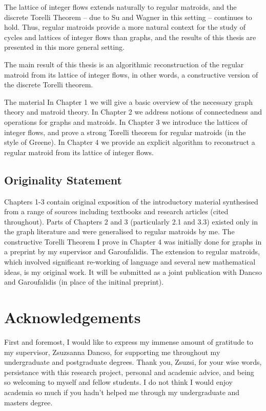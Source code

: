 \documentclass[12pt]{report}
\theoremstyle{definition}
\theoremstyle{upright}
\begin{document}
    The lattice of integer flows extends naturally to regular matroids, and the discrete Torelli Theorem -- due to Su and Wagner in this setting -- continues to hold. Thus, regular matroids provide a more natural context for the study of cycles and lattices of integer flows than graphs, and the results of this thesis are presented in this more general setting.
    
    The main result of this thesis is an algorithmic reconstruction of the regular matroid from its lattice of integer flows, in other words, a constructive version of the discrete Torelli theorem.

    The material 
    In Chapter 1 we will give a basic overview of the necessary graph theory and matroid theory.
    In Chapter 2 we address notions of connectedness and operations for graphs and matroids.
    In Chapter 3 we introduce the lattices of integer flows, and prove a strong Torelli theorem for regular matroids (in the style of Greene).
    In Chapter 4 we provide an explicit algorithm to reconstruct a regular matroid from its lattice of integer flows.

    \section*{Originality Statement} Chapters 1-3 contain original exposition of the introductory material synthesised from a range of sources including textbooks and research articles (cited throughout). Parts of Chapters 2 and 3 (particularly 2.1 and 3.3) existed only in the graph literature and were generalised to regular matroids by me. The constructive Torelli Theorem I prove in Chapter 4 was initially done for graphs in a preprint by my supervisor and Garoufalidis. The extension to regular matroids, which involved significant re-working of language and several new mathematical ideas, is my original work. It will be submitted as a joint publication with Dancso and Garoufalidis (in place of the initinal preprint).

\newpage

\chapter*{Acknowledgements}
\label{sec:Acknowledgements}

First and foremost, I would like to express my immense amount of gratitude to my supervisor, Zsuzsanna Dancso, for supporting me throughout my undergraduate and postgraduate degrees.
Thank you, Zsuzsi, for your wise words, persistance with this research project, personal and academic advice, and being so welcoming to myself and fellow students.
I do not think I would enjoy academia so much if you hadn't helped me through my undergraduate and masters degree.
\end{document}
